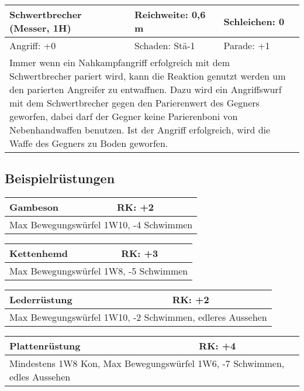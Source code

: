 \documentclass[../../Heldenanleitung2]{subfiles}
\begin{document}
\newline \newline\newline
\begin{tabular}{|p{}|p{}|p{}|}
\hline
\textbf{Schwertbrecher (Messer, 1H)} & Reichweite: 0,6\,m & Schleichen: 0 \\
\hline
Angriff: +0 & Schaden: Stä-1 & Parade: +1\\
\hline
\multicolumn{3}{|p{0.99\textwidth}|}{
Immer wenn ein Nahkampfangriff erfolgreich mit dem Schwertbrecher pariert wird, kann die Reaktion genutzt werden um den parierten Angreifer zu entwaffnen. Dazu wird ein Angriffswurf mit dem Schwertbrecher gegen den Parierenwert des Gegners geworfen, dabei darf der Gegner keine Parierenboni von Nebenhandwaffen benutzen. Ist der Angriff erfolgreich, wird die Waffe des Gegners zu Boden geworfen.
} \\
\hline
\end{tabular}

\subsection{Beispielrüstungen}
\begin{multicols}{2}
\begin{tabular}{|p{}|p{}|}
\hline
\textbf{Gambeson} & RK: +2\\
\hline
\multicolumn{2}{|p{0.4\textwidth}|}{Max Bewegungswürfel 1W10, -4 Schwimmen} \\
\hline
\end{tabular} 


\begin{tabular}{|p{}|p{}|}
\hline
\textbf{Kettenhemd} & RK: +3\\
\hline
\multicolumn{2}{|p{0.4\textwidth}|}{Max Bewegungswürfel 1W8, -5 Schwimmen} \\
\hline
\end{tabular}

\begin{tabular}{|p{}|p{}|}
\hline
\textbf{Lederrüstung} & RK: +2\\
\hline
\multicolumn{2}{|p{0.4\textwidth}|}{Max Bewegungswürfel 1W10, -2 Schwimmen, edleres Aussehen} \\
\hline
\end{tabular}

\begin{tabular}{|p{}|p{}|}
\hline
\textbf{Plattenrüstung} & RK: +4\\
\hline
\multicolumn{2}{|p{0.4\textwidth}|}{Mindestens 1W8 Kon, Max Bewegungswürfel 1W6, -7 Schwimmen, edles Aussehen} \\
\hline
\end{tabular}
\end{multicols}
\end{document}
